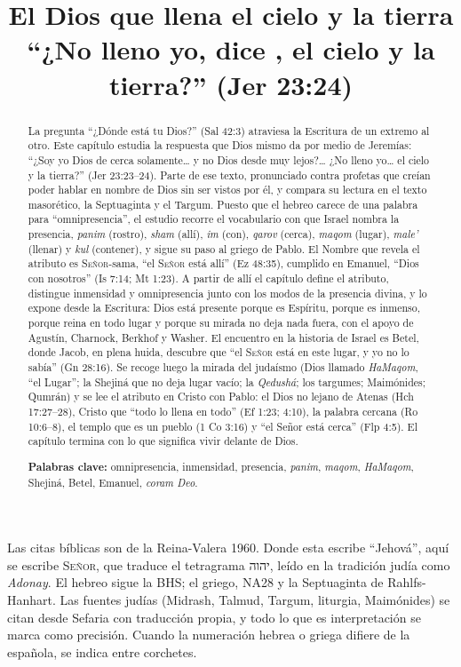 \documentclass[11pt,letterpaper]{article}
\title{\color{azul}\bfseries El Dios que llena el cielo y la tierra\\[4pt]\large\color{gris}\mdseries ``¿No lleno yo, dice \SENOR{}, el cielo y la tierra?'' (Jer 23:24)}
\author{}\date{}
\newcommand{\heb}[1]{\mbox{\foreignlanguage{hebrew}{#1}}}
\newcommand{\SENOR}{\textsc{Señor}}
\begin{document}
\maketitle\thispagestyle{empty}

\begin{abstract}\noindent
La pregunta ``¿Dónde está tu Dios?'' (Sal 42:3) atraviesa la Escritura de un extremo al otro. Este capítulo estudia la respuesta que Dios mismo da por medio de Jeremías: ``¿Soy yo Dios de cerca solamente\ldots{} y no Dios desde muy lejos?\ldots{} ¿No lleno yo\ldots{} el cielo y la tierra?'' (Jer 23:23--24). Parte de ese texto, pronunciado contra profetas que creían poder hablar en nombre de Dios sin ser vistos por él, y compara su lectura en el texto masorético, la Septuaginta y el Targum. Puesto que el hebreo carece de una palabra para ``omnipresencia'', el estudio recorre el vocabulario con que Israel nombra la presencia, \emph{panim} (rostro), \emph{sham} (allí), \emph{im} (con), \emph{qarov} (cerca), \emph{maqom} (lugar), \emph{male'} (llenar) y \emph{kul} (contener), y sigue su paso al griego de Pablo. El Nombre que revela el atributo es \SENOR{}-sama, ``el \SENOR{} está allí'' (Ez 48:35), cumplido en Emanuel, ``Dios con nosotros'' (Is 7:14; Mt 1:23). A partir de allí el capítulo define el atributo, distingue inmensidad y omnipresencia junto con los modos de la presencia divina, y lo expone desde la Escritura: Dios está presente porque es Espíritu, porque es inmenso, porque reina en todo lugar y porque su mirada no deja nada fuera, con el apoyo de Agustín, Charnock, Berkhof y Washer. El encuentro en la historia de Israel es Betel, donde Jacob, en plena huida, descubre que ``el \SENOR{} está en este lugar, y yo no lo sabía'' (Gn 28:16). Se recoge luego la mirada del judaísmo (Dios llamado \emph{HaMaqom}, ``el Lugar''; la Shejiná que no deja lugar vacío; la \emph{Qedushá}; los targumes; Maimónides; Qumrán) y se lee el atributo en Cristo con Pablo: el Dios no lejano de Atenas (Hch 17:27--28), Cristo que ``todo lo llena en todo'' (Ef 1:23; 4:10), la palabra cercana (Ro 10:6--8), el templo que es un pueblo (1 Co 3:16) y ``el Señor está cerca'' (Flp 4:5). El capítulo termina con lo que significa vivir delante de Dios.
\par\smallskip\noindent\textbf{Palabras clave:} omnipresencia, inmensidad, presencia, \emph{panim}, \emph{maqom}, \emph{HaMaqom}, Shejiná, Betel, Emanuel, \emph{coram Deo}.\end{abstract}

\begin{nota}
Las citas bíblicas son de la Reina-Valera 1960. Donde esta escribe ``Jehová'', aquí se escribe \SENOR, que traduce el tetragrama \heb{יהוה}, leído en la tradición judía como \emph{Adonay}. El hebreo sigue la BHS; el griego, NA28 y la Septuaginta de Rahlfs-Hanhart. Las fuentes judías (Midrash, Talmud, Targum, liturgia, Maimónides) se citan desde Sefaria con traducción propia, y todo lo que es interpretación se marca como precisión. Cuando la numeración hebrea o griega difiere de la española, se indica entre corchetes.
\end{nota}
\end{document}
